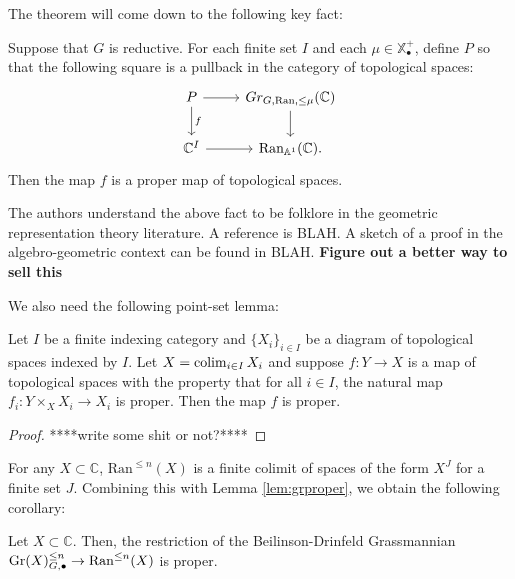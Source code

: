 The theorem will come down to the following key fact:

\begin{lem} \label{lem:grproper}
Suppose that $G$ is reductive.  For each finite set $I$ and each $\mu \in \mathbb{X}_{\bullet}^+$, define $P$ so that the following square is a pullback in the category of topological spaces:
$$
\begin{tikzcd}
P \arrow{r} \arrow{d}{f} & Gr_{G,\text{Ran},\le \mu}(\mathbb{C}) \arrow{d} \\
\mathbb{C}^I \arrow{r} & \text{Ran}_{\mathbb{A}^1}(\mathbb{C}).
\end{tikzcd}
$$
Then the map $f$ is a proper map of topological spaces.
\end{lem}

The authors understand the above fact to be folklore in the geometric representation theory literature.  A reference is BLAH.  A sketch of a proof in the algebro-geometric context can be found in BLAH.  \textbf{Figure out a better way to sell this}


We also need the following point-set lemma:

\begin{lem}\label{lem:colimproper}
Let $I$ be a finite indexing category and $\{X_i\}_{i\in I}$ be a diagram of topological spaces indexed by $I$.  Let $X = \operatorname*{\mathrm{colim}}_{i\in I} X_i$ and suppose $f: Y \to X$ is a map of topological spaces with the property that for all $i\in I$, the natural map $f_i: Y\times_X X_i \to X_i$ is proper.  Then the map $f$ is proper.
\end{lem}
\begin{proof}
****write some shit or not?****
\end{proof}

For any $X\subset \mathbb{C}$, $\mathrm{Ran}^{\leq n}(X)$ is a finite colimit of spaces of the form $X^J$ for a finite set $J$.  Combining this with Lemma \ref{lem:grproper}, we obtain the following corollary:

\begin{cor}\label{cor:ranproper}
Let $X\subset \mathbb{C}$.  Then, the restriction of the Beilinson-Drinfeld Grassmannian $\operatorname{\mathrm{Gr}}(X)_{G,\bullet}^{\leq n} \to \mathrm{Ran}^{\leq n}(X)$ is proper.
\end{cor}

